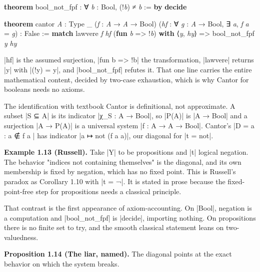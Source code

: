 \documentclass{memoir}
\begin{document}
\begin{LeanVerbatim}
\textbf{theorem} bool_not_fpf : ∀ \textit{b} : Bool, (!\textit{b}) ≠ \textit{b} := \textbf{by} \textbf{decide}

\end{LeanVerbatim}


\begin{LeanVerbatim}
\textbf{theorem} cantor \textit{A} : Type _ (\textit{f} : \textit{A} → \textit{A} → Bool)
    (\textit{hf} : ∀ \textit{g} : \textit{A} → Bool, ∃ \textit{a}, \textit{f} \textit{a} = \textit{g}) : False :=
  \textbf{match} lawvere \textit{f} \textit{hf} (\textbf{fun} \textit{b} => !\textit{b}) \textbf{with}
   ⟨\textit{y}, \textit{hy}⟩ => bool_not_fpf \textit{y} \textit{hy}

\end{LeanVerbatim}


\LeanVerb|hf| is the assumed surjection, \LeanVerb|fun b => !b| the transformation, \LeanVerb|lawvere|
returns \LeanVerb|y| with \LeanVerb|(!y) = y|, and \LeanVerb|bool_not_fpf| refutes it. That one line
carries the entire mathematical content, decided by two-case exhaustion, which
is why Cantor for booleans needs no axioms.

The identification with textbook Cantor is definitional, not approximate. A
subset \LeanVerb|S ⊆ A| is its indicator \LeanVerb|χ_S : A → Bool|, so \LeanVerb|P(A)| is \LeanVerb|A → Bool| and a
surjection \LeanVerb|A → P(A)| is a universal system \LeanVerb|f : A → A → Bool|. Cantor's \LeanVerb|D =  a : a ∉ f a |
has indicator \LeanVerb|a ↦ not (f a a)|, our diagonal for \LeanVerb|t = not|.

\textbf{Example 1.13 (Russell).} Take \LeanVerb|Y| to be propositions and \LeanVerb|t| logical negation.
The behavior "indices not containing themselves" is the diagonal, and its own
membership is fixed by negation, which has no fixed point. This is Russell's
paradox as Corollary 1.10 with \LeanVerb|t = ¬|. It is stated in prose because the
fixed-point-free step for propositions needs a classical principle.

That contrast is the first appearance of axiom-accounting. On \LeanVerb|Bool|, negation
is a computation and \LeanVerb|bool_not_fpf| is \LeanVerb|decide|, importing nothing. On
propositions there is no finite set to try, and the smooth classical statement
leans on two-valuedness.

\textbf{Proposition 1.14 (The liar, named).} The diagonal points at the exact behavior on
which the system breaks.
\end{document}
